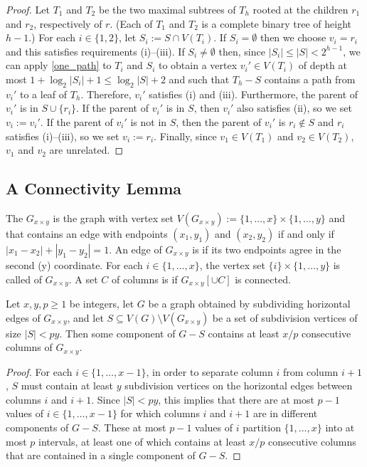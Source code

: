 \documentclass{patmorin}
\renewcommand{\le}{\leqslant}
\renewcommand{\ge}{\geqslant}
\begin{document}
\begin{proof}
  Let $T_1$ and $T_2$ be the two maximal subtrees of $T_h$ rooted at the children $r_1$ and $r_2$, respectively of $r$. (Each of $T_1$ and $T_2$ is a complete binary tree of height $h-1$.)  For each $i\in\{1,2\}$, let $S_i:=S\cap V(T_i)$.  If $S_i=\emptyset$ then we choose $v_i=r_i$ and this satisfies requirements (i)--(iii).  If $S_i\neq\emptyset$ then, since $|S_i|\le |S|< 2^{h-1}$, we can apply \cref{one_path} to $T_i$ and $S_i$ to obtain a vertex $v_i'\in V(T_i)$ of depth at most $1+\log_2|S_i|+1 \le \log_2 |S| + 2$ and such that $T_h-S$ contains a path from $v_i'$ to a leaf of $T_h$.  Therefore, $v_i'$ satisfies (i) and (iii).  Furthermore, the parent of $v_i'$ is in $S\cup\{r_i\}$.  If the parent of $v_i'$ is in $S$, then $v_i'$ also satisfies (ii), so we set $v_i:=v_i'$.  If the parent of $v_i'$ is not in $S$, then the parent of $v_i'$ is $r_i\not\in S$ and $r_i$ satisfies (i)--(iii), so we set $v_i:=r_i$.  Finally, since $v_1\in V(T_1)$ and $v_2\in V(T_2)$, $v_1$ and $v_2$ are unrelated.
\end{proof}

\subsection{A Connectivity Lemma}

The  $G_{x\times y}$ is the graph with vertex set $V(G_{x\times y}):=\{1,\ldots,x\}\times\{1,\ldots,y\}$ and that contains an edge with endpoints $(x_1,y_1)$ and $(x_2,y_2)$ if and only if $|x_1-x_2|+|y_1-y_2|=1$.  An edge of $G_{x\times y}$ is  if its two endpoints agree in the second (y) coordinate.  For each $i\in\{1,\ldots,x\}$, the vertex set $\{i\}\times\{1,\ldots,y\}$ is called  of $G_{x\times y}$.  A set $C$ of columns is  if $G_{x\times y}[\cup C]$ is connected.


\begin{lem}\label{grid_connectivity}
  Let $x,y,p\ge 1$ be integers, let $G$ be a graph obtained by subdividing horizontal edges of $G_{x\times y}$, and let $S\subseteq V(G)\setminus V(G_{x\times y})$ be a set of subdivision vertices of size $|S|< py$.  Then some component of $G-S$ contains at least $x/p$ consecutive columns of $G_{x\times y}$.
\end{lem}

\begin{proof}
  For each $i\in\{1,\ldots,x-1\}$, in order to separate column $i$ from column $i+1$, $S$ must contain at least $y$ subdivision vertices on the horizontal edges between columns $i$ and $i+1$.  Since $|S|< py$, this implies that there are at most $p-1$ values of $i\in\{1,\ldots,x-1\}$ for which columns $i$ and $i+1$ are in different components of $G-S$. These at most $p-1$ values of $i$ partition $\{1,\ldots,x\}$ into at most $p$ intervals, at least one of which contains at least $x/p$ consecutive columns that are contained in a single component of $G-S$.
\end{proof}
\end{document}
